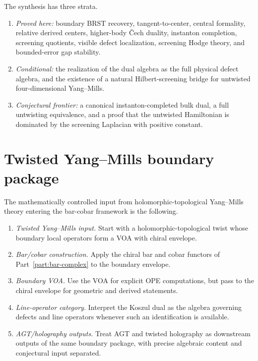 \begin{remark}
\label{rem:status-stratification-platonic-synthesis}
The synthesis has three strata.
\begin{enumerate}[label=(\alph*)]
\item \emph{Proved here:} boundary BRST recovery, tangent-to-center, central formality,
relative derived centers, higher-body \v{C}ech duality, instanton completion, screening quotients,
visible defect localization, screening Hodge theory, and bounded-error gap stability.
\item \emph{Conditional:} the realization of the dual algebra as the full physical defect algebra,
and the existence of a natural Hilbert-screening bridge for untwisted four-dimensional Yang--Mills.
\item \emph{Conjectural frontier:} a canonical instanton-completed bulk dual, a full untwisting equivalence,
and a proof that the untwisted Hamiltonian is dominated by the screening Laplacian with positive constant.
\end{enumerate}
\end{remark}


\section{Twisted Yang--Mills boundary package}
\label{sec:twisted-ym-boundary-package}

\begin{summary}[Programme]
The mathematically controlled input from
holomorphic-topological Yang--Mills theory entering the bar-cobar framework is the following.

\begin{enumerate}[label=(\roman*)]
\item \emph{Twisted Yang--Mills input.} Start with a holomorphic-topological twist whose
boundary local operators form a VOA with chiral envelope.
\item \emph{Bar/cobar construction.} Apply the chiral bar and cobar functors of Part~\ref{part:bar-complex} to the
boundary envelope.
\item \emph{Boundary VOA.} Use the VOA for explicit OPE computations, but pass to the chiral
envelope for geometric and derived statements.
\item \emph{Line-operator category.} Interpret the Koszul dual as the algebra governing defects
and line operators whenever such an identification is available.
\item \emph{AGT/holography outputs.} Treat AGT and twisted holography as downstream outputs of
the same boundary package, with precise algebraic content and conjectural input separated.
\end{enumerate}
\end{summary}

